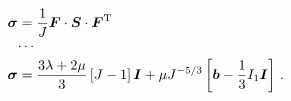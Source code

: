 \documentclass[10pt,letterpaper,oneside]{report}
\newcommand{\ten}[1]{\mbox{\boldmath $#1$}{}}
\newcommand{\scas}[1]{\mbox{{\scriptsize{${\rm{#1}}$}}}{}}
\begin{document}
\begin{itemize}
\begin{align}
\ten{\sigma} 
={}& \frac{1}{J} \ten{F} \cdot \ten{S} \cdot \ten{F}^{\scas{T}} 
\\
\cdots{}& \notag \\
\ten{\sigma} 
={}& \frac{3 \lambda + 2 \mu}{3} \left[ J - 1 \right] \ten{I} + \mu J^{-5/3} \left[ \ten{b} - \frac{1}{3} I_1 \ten{I} \right] \, . 
\end{align}


\end{itemize}
\end{document}
